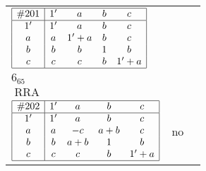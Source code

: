 \documentclass[12pt]{article}
\theoremstyle{definition}
\newcommand\RRA{\operatorname{RRA}}
\newcommand{\join}{\mathbin{+}}%
\newcommand{\id}{{1'}}%
\renewcommand{\top}{1}%
\begin{document}
\begin{center}
\begin{longtable}{l|c|c}
$
\begin{array}{|c|cccc|} \hline
\#201 & \id & a & b & c \\ \hline
\id & \id & a & b & c \\
a & a & \id \join a & b & c \\
b & b & b & \top & b \\
c & c & c & b & \id \join a \\ \hline
\end{array}
$
 & \begin{tabular}{c} yes \\ $6_{65}$ \\ $\RRA$ \end{tabular} 
 & \adjustbox{valign=c, max height=1.6cm}{$
\left[ \begin{array}{cccccc}
\id & a & a & b & c & b \\ 
a & \id & a & b & c & b \\ 
a & a & \id & b & c & b \\ 
b & b & b & \id & b & b \\ 
c & c & c & b & \id & b \\ 
b & b & b & b & b & \id
\end{array}\right]
$}      \\[15mm]

$
\begin{array}{|c|cccc|} \hline
\#202 & \id & a & b & c \\ \hline
\id & \id & a & b & c \\
a & a & -c & a \join b & c \\
b & b & a \join b & \top & b \\
c & c & c & b & \id \join a \\ \hline
\end{array}
$
 & no  
 & \adjustbox{valign=c, max height=1.6cm}{$
\left[ \begin{array}{ccccccc}
\id & a & a & b & b & b & b \\ 
a & \id & a & a & b & b & b \\ 
a & a & \id & b & b & b & b \\ 
b & a & b & \id & b & b & b \\ 
b & b & b & b & \id & c & a \\ 
b & b & b & b & c & \id & c \\ 
b & b & b & b & a & c & \id
\end{array}\right]
$}      \\[15mm]


\end{longtable}
\end{center}
\end{document}

